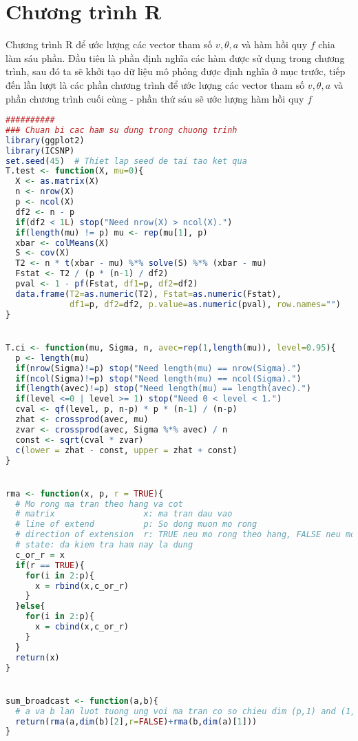 \section{Chương trình R}
Chương trình R để ước lượng các vector tham số $v, \theta, a$  và hàm hồi quy $f$ chia làm sáu phần. Đầu tiên là phần định nghĩa các hàm được sử dụng trong chương trình, sau đó ta sẽ khởi tạo dữ liệu mô phỏng được định nghĩa ở mục trước, tiếp đến lần lượt là các phần chương trình để ước lượng các vector tham số $v, \theta, a$ và phần chương trình cuối cùng - phần thứ sáu sẽ ước lượng hàm hồi quy $f$
\begin{lstlisting}[language=R, title = Phần 1: Các hàm sử dụng trong chương trình]
##########
### Chuan bi cac ham su dung trong chuong trinh
library(ggplot2)
library(ICSNP)
set.seed(45)  # Thiet lap seed de tai tao ket qua
T.test <- function(X, mu=0){
  X <- as.matrix(X)
  n <- nrow(X)
  p <- ncol(X)
  df2 <- n - p
  if(df2 < 1L) stop("Need nrow(X) > ncol(X).")
  if(length(mu) != p) mu <- rep(mu[1], p)
  xbar <- colMeans(X)
  S <- cov(X)
  T2 <- n * t(xbar - mu) %*% solve(S) %*% (xbar - mu)
  Fstat <- T2 / (p * (n-1) / df2)
  pval <- 1 - pf(Fstat, df1=p, df2=df2)
  data.frame(T2=as.numeric(T2), Fstat=as.numeric(Fstat),
             df1=p, df2=df2, p.value=as.numeric(pval), row.names="")
}


T.ci <- function(mu, Sigma, n, avec=rep(1,length(mu)), level=0.95){
  p <- length(mu)
  if(nrow(Sigma)!=p) stop("Need length(mu) == nrow(Sigma).")
  if(ncol(Sigma)!=p) stop("Need length(mu) == ncol(Sigma).")
  if(length(avec)!=p) stop("Need length(mu) == length(avec).")
  if(level <=0 | level >= 1) stop("Need 0 < level < 1.")
  cval <- qf(level, p, n-p) * p * (n-1) / (n-p)
  zhat <- crossprod(avec, mu)
  zvar <- crossprod(avec, Sigma %*% avec) / n
  const <- sqrt(cval * zvar)
  c(lower = zhat - const, upper = zhat + const)
}


rma <- function(x, p, r = TRUE){
  # Mo rong ma tran theo hang va cot
  # matrix                  x: ma tran dau vao
  # line of extend          p: So dong muon mo rong
  # direction of extension  r: TRUE neu mo rong theo hang, FALSE neu mo rong theo cot
  # state: da kiem tra ham nay la dung
  c_or_r = x
  if(r == TRUE){
    for(i in 2:p){
      x = rbind(x,c_or_r)
    }
  }else{
    for(i in 2:p){
      x = cbind(x,c_or_r)
    }
  }
  return(x)
}


sum_broadcast <- function(a,b){
  # a va b lan luot tuong ung voi ma tran co so chieu dim (p,1) and (1,p)
  return(rma(a,dim(b)[2],r=FALSE)+rma(b,dim(a)[1]))
}



\end{lstlisting}
